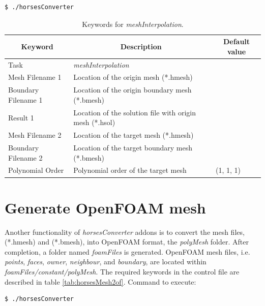 \documentclass[a4paper,10pt]{report}
\begin{document}
\begin{lstlisting}[language=bash]
	$ ./horsesConverter
\end{lstlisting}

\begin{longtable}{|p{4cm}|p{10cm}|p{2.2cm}|}
\caption{Keywords for \textit{meshInterpolation}.} \label{tab:mappingresult} \\
\hline
\multicolumn{1}{|c|}{\textbf{Keyword}} & \multicolumn{1}{c|}{\textbf{Description}} & \multicolumn{1}{c|}{\textbf{Default value}} \\ \hline
\endfirsthead

Task 	        		& \textit{meshInterpolation} 						&  \\ \hline
Mesh Filename 1 		& Location of the origin mesh (*.hmesh) 	&  \\ \hline
Boundary Filename 1 	& Location of the origin boundary mesh (*.bmesh) 	&  \\ \hline
Result 1 			& Location of the solution file with origin mesh (*.hsol) 	&  \\ \hline
Mesh Filename 2 		& Location of the target mesh (*.hmesh) 	&  \\ \hline
Boundary Filename 2 	& Location of the target boundary mesh (*.bmesh) 	&  \\ \hline
Polynomial Order 	& Polynomial order of the target mesh 	& (1, 1, 1) \\ \hline
\end{longtable}

\section{Generate OpenFOAM mesh} \label{tab:horsesMesh2OF}
Another functionality of \textit{horsesConverter} addons is to convert the mesh files, (*.hmesh) and (*.bmesh), into OpenFOAM format, the \textit{polyMesh} folder. After completion, a folder named \emph{foamFiles} is generated. OpenFOAM mesh files, i.e. \textit{points}, \textit{faces}, \textit{owner}, \textit{neighbour}, and \textit{boundary}, are located within \emph{foamFiles/constant/polyMesh}. The required keywords in the control file are described in table \ref{tab:horsesMesh2of}. Command to execute:

\begin{lstlisting}[language=bash]
	$ ./horsesConverter
\end{lstlisting}
\end{document}
